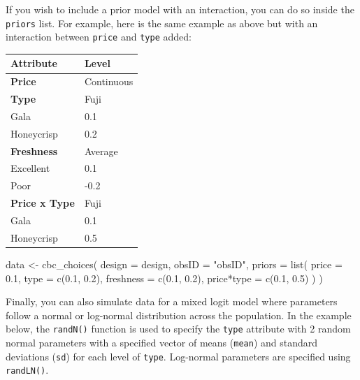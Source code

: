 \documentclass[
  12pt,
]{article}
\newenvironment{Shaded}{\begin{snugshade}}{\end{snugshade}}
\newcommand{\AttributeTok}[1]{\textcolor[rgb]{0.77,0.63,0.00}{#1}}
\newcommand{\FloatTok}[1]{\textcolor[rgb]{0.00,0.00,0.81}{#1}}
\newcommand{\FunctionTok}[1]{\textcolor[rgb]{0.00,0.00,0.00}{#1}}
\newcommand{\NormalTok}[1]{#1}
\newcommand{\OtherTok}[1]{\textcolor[rgb]{0.56,0.35,0.01}{#1}}
\newcommand{\StringTok}[1]{\textcolor[rgb]{0.31,0.60,0.02}{#1}}
\begin{document}
If you wish to include a prior model with an interaction, you can do so
inside the \texttt{priors} list. For example, here is the same example
as above but with an interaction between \texttt{price} and
\texttt{type} added:

\begin{longtable}[]{@{}ll@{}}
\toprule
Attribute & Level \\
\midrule
\endhead
\textbf{Price} & Continuous \\
\textbf{Type} & Fuji \\
Gala & 0.1 \\
Honeycrisp & 0.2 \\
\textbf{Freshness} & Average \\
Excellent & 0.1 \\
Poor & -0.2 \\
\textbf{Price x Type} & Fuji \\
Gala & 0.1 \\
Honeycrisp & 0.5 \\
\bottomrule
\end{longtable}

\begin{Shaded}
\begin{Highlighting}[]
\NormalTok{data }\OtherTok{\textless{}{-}} \FunctionTok{cbc\_choices}\NormalTok{(}
  \AttributeTok{design =}\NormalTok{ design,}
  \AttributeTok{obsID =} \StringTok{"obsID"}\NormalTok{,}
  \AttributeTok{priors =} \FunctionTok{list}\NormalTok{(}
    \AttributeTok{price =} \FloatTok{0.1}\NormalTok{,}
    \AttributeTok{type =} \FunctionTok{c}\NormalTok{(}\FloatTok{0.1}\NormalTok{, }\FloatTok{0.2}\NormalTok{),}
    \AttributeTok{freshness =} \FunctionTok{c}\NormalTok{(}\FloatTok{0.1}\NormalTok{, }\FloatTok{0.2}\NormalTok{),}
    \StringTok{\textasciigrave{}}\AttributeTok{price*type}\StringTok{\textasciigrave{}} \OtherTok{=} \FunctionTok{c}\NormalTok{(}\FloatTok{0.1}\NormalTok{, }\FloatTok{0.5}\NormalTok{)}
\NormalTok{  )}
\NormalTok{)}
\end{Highlighting}
\end{Shaded}

Finally, you can also simulate data for a mixed logit model where
parameters follow a normal or log-normal distribution across the
population. In the example below, the \texttt{randN()} function is used
to specify the \texttt{type} attribute with 2 random normal parameters
with a specified vector of means (\texttt{mean}) and standard deviations
(\texttt{sd}) for each level of \texttt{type}. Log-normal parameters are
specified using \texttt{randLN()}.
\end{document}
